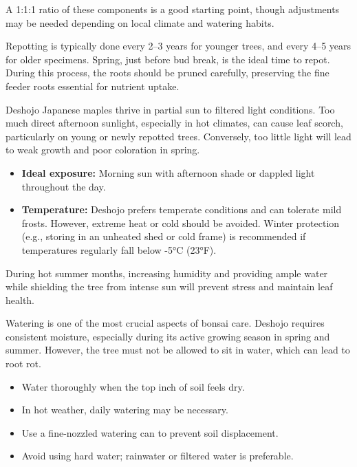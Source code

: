 A 1:1:1 ratio of these components is a good starting point, though adjustments may be needed depending on local climate and watering habits.

Repotting is typically done every 2--3 years for younger trees, and every 4--5 years for older specimens. Spring, just before bud break, is the ideal time to repot. During this process, the roots should be pruned carefully, preserving the fine feeder roots essential for nutrient uptake.

\medskip
{}
\noindent
Deshojo Japanese maples thrive in partial sun to filtered light conditions. Too much direct afternoon sunlight, especially in hot climates, can cause leaf scorch, particularly on young or newly repotted trees. Conversely, too little light will lead to weak growth and poor coloration in spring.

\begin{itemize}
    \item \textbf{Ideal exposure:} Morning sun with afternoon shade or dappled light throughout the day.
    \item \textbf{Temperature:} Deshojo prefers temperate conditions and can tolerate mild frosts. However, extreme heat or cold should be avoided. Winter protection (e.g., storing in an unheated shed or cold frame) is recommended if temperatures regularly fall below -5°C (23°F).
\end{itemize}

During hot summer months, increasing humidity and providing ample water while shielding the tree from intense sun will prevent stress and maintain leaf health.

\medskip
{}
\noindent
Watering is one of the most crucial aspects of bonsai care. Deshojo requires consistent moisture, especially during its active growing season in spring and summer. However, the tree must not be allowed to sit in water, which can lead to root rot.

\medskip
{}
\noindent
\begin{itemize}
    \item Water thoroughly when the top inch of soil feels dry.
    \item In hot weather, daily watering may be necessary.
    \item Use a fine-nozzled watering can to prevent soil displacement.
    \item Avoid using hard water; rainwater or filtered water is preferable.
\end{itemize}

